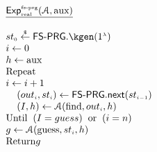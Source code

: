 

\
\begin{center}
\begin{minipage}{57mm}
\begin{tcolorbox}[left=0mm]

$
  \begin{array}{l}
%
\underline{\mathsf{Exp}_{\sss \text{real}}^{\sss \text{fs-prg}}(\mathcal{A},\text{aux})}\\
%
\\
%
{st}_{\sss 0}\stackrel{\sss \$}\leftarrow \mathsf{FS\text{-}PRG}.\kgen(1^{\sss \lambda}) \\
%
i\gets 0\\ h\gets \text{aux} \\
\text {Repeat}\\
i\gets i+1\\
\hspace{4mm} ({out}_{\sss i}, st_{\sss i})\leftarrow    \mathsf{FS\text{-}PRG.next}    (st_{\sss i-1})\\
\hspace{4mm}  (I, h)\gets\mathcal{A}(\text{find}, out_{\sss i}, h)\\
\text{Until}\hspace{2mm}  (I=guess)\hspace{2mm}  \text{or} \hspace{2mm}  (i=n)\\
g\gets\mathcal{A}(\text{guess}, st_{\sss i}, h)\\
\text{Return} g\\
  \end{array}%
  \qquad$
  \end{tcolorbox}
   \end{minipage}
     \end{center}
   
